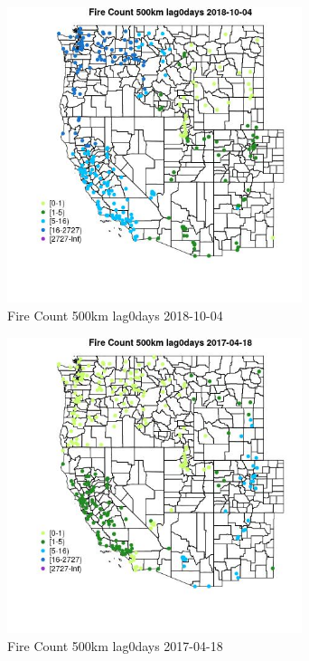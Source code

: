 \begin{figure} 
\centering  
\includegraphics[width=0.77\textwidth]{Code_Outputs/Report_ML_input_PM25_Step4_part_f_de_duplicated_aves_prioritize_24hr_obswNAs_MapObsFire_Count_500km_lag0days2018-10-04.jpg} 
\caption{\label{fig:Report_ML_input_PM25_Step4_part_f_de_duplicated_aves_prioritize_24hr_obswNAsMapObsFire_Count_500km_lag0days2018-10-04}Fire Count 500km lag0days 2018-10-04} 
\end{figure} 
 

\clearpage 

\begin{figure} 
\centering  
\includegraphics[width=0.77\textwidth]{Code_Outputs/Report_ML_input_PM25_Step4_part_f_de_duplicated_aves_prioritize_24hr_obswNAs_MapObsFire_Count_500km_lag0days2017-04-18.jpg} 
\caption{\label{fig:Report_ML_input_PM25_Step4_part_f_de_duplicated_aves_prioritize_24hr_obswNAsMapObsFire_Count_500km_lag0days2017-04-18}Fire Count 500km lag0days 2017-04-18} 
\end{figure} 
 

